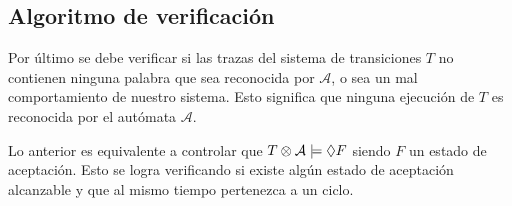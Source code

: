 \subsection{Algoritmo de verificación}
Por último se debe verificar si las trazas del sistema de transiciones $T$ no contienen ninguna palabra
 que sea reconocida por $\mathcal{A}$, o sea un mal comportamiento de nuestro sistema. Esto significa que
 ninguna ejecución de $T$ es reconocida por el autómata $\mathcal{A}$.

Lo anterior es equivalente a controlar que $T \otimes \mathcal{A} \models \lozenge \box \lnot F$
 siendo $F$ un estado de aceptación.
Esto se logra verificando si existe algún estado de aceptación alcanzable y que al mismo tiempo pertenezca
 a un ciclo.
 
